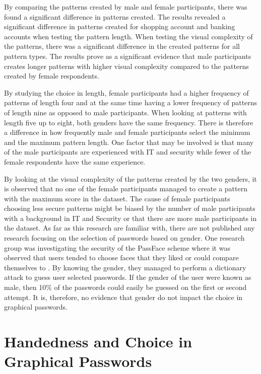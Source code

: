     By comparing the patterns created by male and female participants, there was found a significant difference in patterns created. The results revealed a significant difference in patterns created for shopping account and banking accounts when testing the pattern length. When testing the visual complexity of the patterns, there was a significant difference in the created patterns for all pattern types. The results prove as a significant evidence that male participants creates longer patterns with higher visual complexity compared to the patterns created by female respondents.

    By studying the choice in length, female participants had a higher frequency of patterns of length four and at the same time having a lower frequency of patterns of length nine as opposed to male participants. When looking at patterns with length five up to eight, both genders have the same frequency. There is therefore a difference in how frequently male and female participants select the minimum and the maximum pattern length. One factor that may be involved is that many of the male participants are experienced with IT and security while fewer of the female respondents have the same experience. 

    By looking at the visual complexity of the patterns created by the two genders, it is observed that no one of the female participants managed to create a pattern with the maximum score in the dataset.  The cause of female participants choosing less secure patterns might be biased by the number of male participants with a background in IT and Security or that there are more male participants in the dataset.  As far as this research are familiar with, there are not published any research focusing on the selection of passwords based on gender. One research group was investigating the security of the PassFace scheme where it was observed that users tended to choose faces that they liked or could compare themselves to \cite{Davis}. By knowing the gender, they managed to perform a dictionary attack to guess user selected passwords. If the gender of the user were known as male, then 10\% of the passwords could easily be guessed on the first or second attempt. It is, therefore, no evidence that gender do not impact the choice in graphical passwords. 
    
  \section{Handedness and Choice in Graphical Passwords}
    
